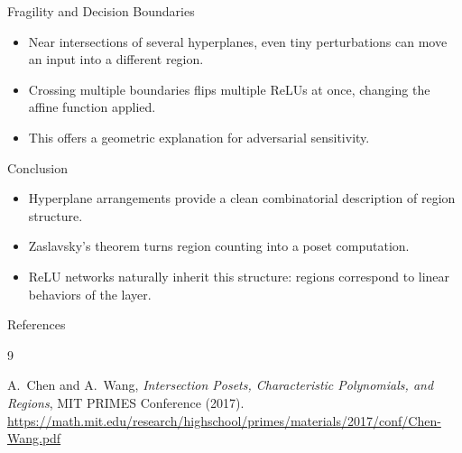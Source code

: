 \documentclass{beamer}
\begin{document}
\begin{frame}{Fragility and Decision Boundaries}
\begin{itemize}
  \item Near intersections of several hyperplanes, even tiny perturbations can move an input into a different region.
  \item Crossing multiple boundaries flips multiple ReLUs at once, changing the affine function applied.
  \item This offers a geometric explanation for adversarial sensitivity.
\end{itemize}

\begin{center}
\end{center}

\end{frame}

\begin{frame}{Conclusion}
\begin{itemize}
  \item Hyperplane arrangements provide a clean combinatorial description of region structure.
  \item Zaslavsky’s theorem turns region counting into a poset computation.
  \item ReLU networks naturally inherit this structure: regions correspond to linear behaviors of the layer.
\end{itemize}
\end{frame}

\begin{frame}{References}
\footnotesize
\begin{thebibliography}{9}

A.~Chen and A.~Wang,
\emph{Intersection Posets, Characteristic Polynomials, and Regions},
MIT PRIMES Conference (2017).
\url{https://math.mit.edu/research/highschool/primes/materials/2017/conf/Chen-Wang.pdf}

\end{thebibliography}
\end{frame}
\end{document}
